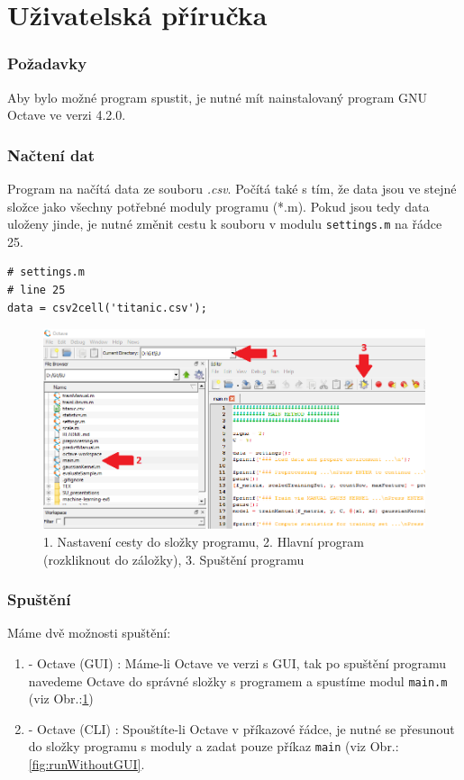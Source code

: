 \documentclass[a4]{article}
\begin{document}
\section{Uživatelská příručka}
\subsubsection{Požadavky}
Aby bylo možné program spustit, je nutné mít nainstalovaný program GNU Octave ve verzi 4.2.0.

\subsubsection{Načtení dat}
Program na načítá data ze souboru \textit{.csv}. Počítá také s tím, že data jsou ve stejné složce jako všechny potřebné moduly programu (*.m). Pokud jsou tedy data uloženy jinde, je nutné změnit cestu k souboru v modulu \texttt{settings.m} na řádce 25.

\begin{lstlisting}
# settings.m
# line 25
data = csv2cell('titanic.csv');
\end{lstlisting}

\begin{figure}[!ht]
	\centering
		\includegraphics[width=\textwidth]{images/runWithGUI}
	\caption{1. Nastavení cesty do složky programu, 2. Hlavní program (rozkliknout do záložky), 3. Spuštění programu}
	\label{fig:runWithGUI}
\end{figure}

\subsubsection{Spuštění}
Máme dvě možnosti spuštění:

\begin{enumerate}
	\item - Octave (GUI) : Máme-li Octave ve verzi s GUI, tak po spuštění programu navedeme Octave do správné složky s programem a spustíme modul \texttt{main.m} (viz Obr.:\ref{fig:runWithGUI})
	\item - Octave (CLI) : Spouštíte-li Octave v příkazové řádce, je nutné se přesunout do složky programu s moduly a zadat pouze příkaz \texttt{main} (viz Obr.:\ref{fig:runWithoutGUI}.
\end{enumerate}
\end{document}

